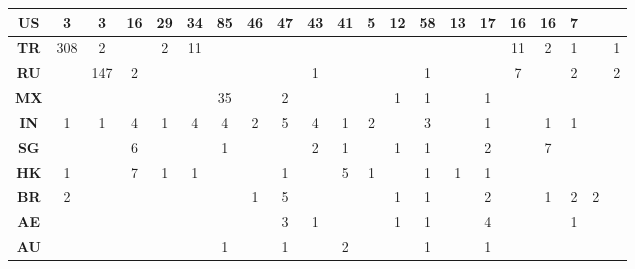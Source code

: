 \begin{table}
\begin{tabular}{ccccccccccccccccccccc}
    \midrule
    \textbf{US} & \cellcolor{green!19}3 & \cellcolor{green!19}3 & \cellcolor{green!33}16 & \cellcolor{green!51}29 & \cellcolor{green!60}34 & \cellcolor{green!100}85 & \cellcolor{green!54}46 & \cellcolor{green!55}47 & \cellcolor{green!50}43 & \cellcolor{green!48}41 & \cellcolor{green!24}5 & \cellcolor{green!36}12 & \cellcolor{green!68}58 & \cellcolor{green!38}13 & \cellcolor{green!44}17 & \cellcolor{green!33}16 & \cellcolor{green!33}16 & \cellcolor{green!27}7 &  &  \\ 
    \midrule
    \textbf{TR} & \cellcolor{green!100}308 & \cellcolor{green!15}2 &  & \cellcolor{green!15}2 & \cellcolor{green!31}11 &  &  &  &  &  &  &  &  &  &  & \cellcolor{green!31}11 & \cellcolor{green!15}2 & \cellcolor{green!15}1 &  & \cellcolor{green!15}1 \\ 
    \midrule
    \textbf{RU} &  & \cellcolor{green!100}147 & \cellcolor{green!15}2 &  &  &  &  &  & \cellcolor{green!15}1 &  &  &  & \cellcolor{green!15}1 &  &  & \cellcolor{green!27}7 &  & \cellcolor{green!15}2 &  & \cellcolor{green!15}2 \\ 
    \midrule
    \textbf{MX} &  &  &  &  &  & \cellcolor{green!41}35 &  & \cellcolor{green!15}2 &  &  &  & \cellcolor{green!15}1 & \cellcolor{green!15}1 &  & \cellcolor{green!15}1 &  &  &  &  &  \\ 
    \midrule
    \textbf{IN} & \cellcolor{green!15}1 & \cellcolor{green!15}1 & \cellcolor{green!19}4 & \cellcolor{green!15}1 & \cellcolor{green!19}4 & \cellcolor{green!19}4 & \cellcolor{green!15}2 & \cellcolor{green!24}5 & \cellcolor{green!19}4 & \cellcolor{green!15}1 & \cellcolor{green!15}2 &  & \cellcolor{green!18}3 &  & \cellcolor{green!15}1 &  & \cellcolor{green!15}1 & \cellcolor{green!15}1 &  &  \\ 
    \midrule
    \textbf{SG} &  &  & \cellcolor{green!27}6 &  &  & \cellcolor{green!15}1 &  &  & \cellcolor{green!15}2 & \cellcolor{green!15}1 &  & \cellcolor{green!15}1 & \cellcolor{green!15}1 &  & \cellcolor{green!15}2 &  & \cellcolor{green!27}7 &  &  &  \\ 
    \midrule
    \textbf{HK} & \cellcolor{green!15}1 &  & \cellcolor{green!27}7 & \cellcolor{green!15}1 & \cellcolor{green!15}1 &  &  & \cellcolor{green!15}1 &  & \cellcolor{green!24}5 & \cellcolor{green!15}1 &  & \cellcolor{green!15}1 & \cellcolor{green!15}1 & \cellcolor{green!15}1 &  &  &  &  &  \\ 
    \midrule
    \textbf{BR} & \cellcolor{green!19}2 &  &  &  &  &  & \cellcolor{green!15}1 & \cellcolor{green!24}5 &  &  &  & \cellcolor{green!15}1 & \cellcolor{green!15}1 &  & \cellcolor{green!19}2 &  & \cellcolor{green!15}1 & \cellcolor{green!19}2 & \cellcolor{green!19}2 &  \\ 
    \midrule
    \textbf{AE} &  &  &  &  &  &  &  & \cellcolor{green!18}3 & \cellcolor{green!15}1 &  &  & \cellcolor{green!15}1 & \cellcolor{green!15}1 &  & \cellcolor{green!24}4 &  &  & \cellcolor{green!15}1 &  &  \\ 
    \midrule
    \textbf{AU} &  &  &  &  &  & \cellcolor{green!15}1 &  & \cellcolor{green!15}1 &  & \cellcolor{green!19}2 &  &  & \cellcolor{green!15}1 &  & \cellcolor{green!15}1 &  &  &  &  &  \\ 



\end{tabular}
\end{table}
